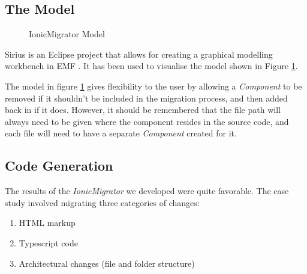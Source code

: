 \documentclass[conference]{IEEEtran}
\begin{document}
\subsection{The Model}
\begin{figure}[H]
\caption{IonicMigrator Model}
\label{fig:model}
\end{figure}

Sirius is an Eclipse project that allows for creating a graphical modelling workbench in EMF \cite{b12}. It has been used to visualise the model shown in Figure \ref{fig:model}.

The model in figure \ref{fig:model} gives flexibility to the user by allowing a \textit{Component} to be removed if it shouldn’t be included in the migration process, and then added back in if it does. However, it should be remembered that the file path will always need to be given where the component resides in the source code, and each file will need to have a separate \textit{Component} created for it.

\subsection{Code Generation}
The results of the \textit{IonicMigrator} we developed were quite favorable. The case study
involved migrating three categories of changes:
\begin{enumerate}
    \item HTML markup
    \item Typescript code
    \item Architectural changes (file and folder structure)
\end{enumerate}
\end{document}
